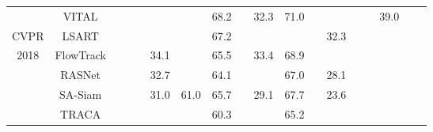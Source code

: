 \documentclass[10pt,twocolumn,letterpaper]{article}
\begin{document}
\begin{table*}[t]
\begin{tabular}{cccccccccccccccccc}
\cmidrule{2-18} \cmidrule{3-18} \cmidrule{4-18} \cmidrule{5-18} \cmidrule{6-18} \cmidrule{7-18} \cmidrule{8-18} \cmidrule{9-18} \cmidrule{10-18} \cmidrule{11-18} \cmidrule{12-18} \cmidrule{13-18} \cmidrule{14-18} \cmidrule{15-18} \cmidrule{16-18} \cmidrule{17-18} \cmidrule{18-18} 
 & VITAL \cite{Song18CVPR} &  &  &  &  &  & 68.2 &  & 32.3 & 71.0 &  &  &  &  & 39.0 &  & \tabularnewline
\cmidrule{2-18} \cmidrule{3-18} \cmidrule{4-18} \cmidrule{5-18} \cmidrule{6-18} \cmidrule{7-18} \cmidrule{8-18} \cmidrule{9-18} \cmidrule{10-18} \cmidrule{11-18} \cmidrule{12-18} \cmidrule{13-18} \cmidrule{14-18} \cmidrule{15-18} \cmidrule{16-18} \cmidrule{17-18} \cmidrule{18-18} 
CVPR & LSART \cite{Sun18CVPR_Spatial} &  &  &  &  &  & 67.2 &  &  &  &  & 32.3 &  &  &  &  & \tabularnewline
\cmidrule{2-18} \cmidrule{3-18} \cmidrule{4-18} \cmidrule{5-18} \cmidrule{6-18} \cmidrule{7-18} \cmidrule{8-18} \cmidrule{9-18} \cmidrule{10-18} \cmidrule{11-18} \cmidrule{12-18} \cmidrule{13-18} \cmidrule{14-18} \cmidrule{15-18} \cmidrule{16-18} \cmidrule{17-18} \cmidrule{18-18} 
2018 & FlowTrack \cite{Zhu18CVPR} &  &  &  & 34.1 &  & 65.5 &  & 33.4 & 68.9 &  &  &  &  &  &  & \tabularnewline
\cmidrule{2-18} \cmidrule{3-18} \cmidrule{4-18} \cmidrule{5-18} \cmidrule{6-18} \cmidrule{7-18} \cmidrule{8-18} \cmidrule{9-18} \cmidrule{10-18} \cmidrule{11-18} \cmidrule{12-18} \cmidrule{13-18} \cmidrule{14-18} \cmidrule{15-18} \cmidrule{16-18} \cmidrule{17-18} \cmidrule{18-18} 
 & RASNet \cite{Wang18CVPR_Residual} &  &  &  & 32.7 &  & 64.1 &  &  & 67.0 &  & 28.1 &  &  &  &  & \tabularnewline
\cmidrule{2-18} \cmidrule{3-18} \cmidrule{4-18} \cmidrule{5-18} \cmidrule{6-18} \cmidrule{7-18} \cmidrule{8-18} \cmidrule{9-18} \cmidrule{10-18} \cmidrule{11-18} \cmidrule{12-18} \cmidrule{13-18} \cmidrule{14-18} \cmidrule{15-18} \cmidrule{16-18} \cmidrule{17-18} \cmidrule{18-18} 
 & SA-Siam \cite{He18CVPR_Twofold} &  &  &  & 31.0 & 61.0 & 65.7 &  & 29.1 & 67.7 &  & 23.6 &  &  &  &  & \tabularnewline
\cmidrule{2-18} \cmidrule{3-18} \cmidrule{4-18} \cmidrule{5-18} \cmidrule{6-18} \cmidrule{7-18} \cmidrule{8-18} \cmidrule{9-18} \cmidrule{10-18} \cmidrule{11-18} \cmidrule{12-18} \cmidrule{13-18} \cmidrule{14-18} \cmidrule{15-18} \cmidrule{16-18} \cmidrule{17-18} \cmidrule{18-18} 
 & TRACA \cite{Choi18CVPR} &  &  &  &  &  & 60.3 &  &  & 65.2 &  &  &  &  &  &  & \tabularnewline
\cmidrule{2-18} \cmidrule{3-18} \cmidrule{4-18} \cmidrule{5-18} \cmidrule{6-18} \cmidrule{7-18} \cmidrule{8-18} \cmidrule{9-18} \cmidrule{10-18} \cmidrule{11-18} \cmidrule{12-18} \cmidrule{13-18} \cmidrule{14-18} \cmidrule{15-18} \cmidrule{16-18} \cmidrule{17-18} \cmidrule{18-18} 

\end{tabular}
\end{table*}
\end{document}
